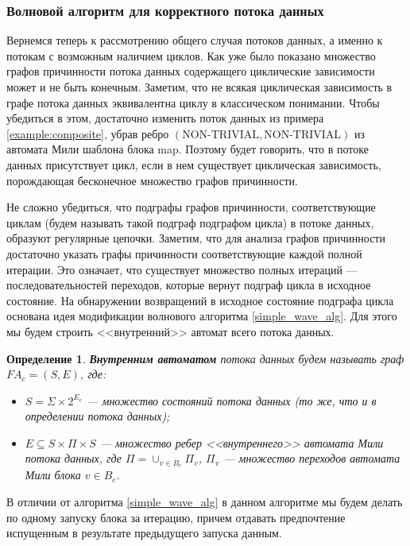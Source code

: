 \documentclass[10pt,a4paper]{article}
\newtheorem{defen}{Определение}
\newcommand{\nontrivial}{\text{NON-TRIVIAL}}
\newcommand{\FA}{F\!A}
\begin{document}
\subsubsection{Волновой алгоритм для корректного потока данных}
  Вернемся теперь к рассмотрению общего случая потоков данных, а именно к потокам с возможным наличием циклов.
  Как уже было показано множество графов причинности потока данных содержащего циклические зависимости может и не быть конечным.
  Заметим, что не всякая циклическая зависимость в графе потока данных эквивалентна циклу в классическом понимании.
  Чтобы убедиться в этом, достаточно изменить поток данных из примера \ref{example:composite},
  убрав ребро $(\nontrivial, \nontrivial)$ из автомата Мили шаблона блока map.
  Поэтому будет говорить, что в потоке данных присутствует цикл, если в нем существует циклическая зависимость, порождающая бесконечное множество графов причинности.
  
  Не сложно убедиться, что подграфы графов причинности, соответствующие циклам (будем называть такой подграф подграфом цикла) в потоке данных, образуют регулярные цепочки.
  Заметим, что для анализа графов причинности достаточно указать графы причинности соответствующие каждой полной итерации.
  Это означает, что существует множество полных итераций --- последовательностей переходов, которые вернут подграф цикла в исходное состояние.
  На обнаружении возвращений в исходное состояние подграфа цикла основана идея модификации волнового алгоритма \ref{simple_wave_alg}.
  Для этого мы будем строить <<внутренний>> автомат всего потока данных.
  
  \begin{defen}
    \textbf{Внутренним автоматом} потока данных будем называть граф $\FA_c = (S, E)$, где:
    \begin{itemize}
      \item $S = \Sigma \times 2^{E_c}$ --- множество состояний потока данных (то же, что и в определении потока данных);
      \item $E \subseteq S \times \Pi \times S$ --- множество ребер <<внутреннего>> автомата Мили потока данных,
        где $\Pi = \cup_{v \in B_c} \Pi_v$, $\Pi_v$ --- множество переходов автомата Мили блока $v \in B_c$.
    \end{itemize}
  \end{defen}
  
  В отличии от алгоритма \ref{simple_wave_alg} в данном алгоритме мы будем делать по одному запуску блока за итерацию, причем отдавать предпочтение
  испущенным в результате предыдущего запуска данным.
  
\end{document}
